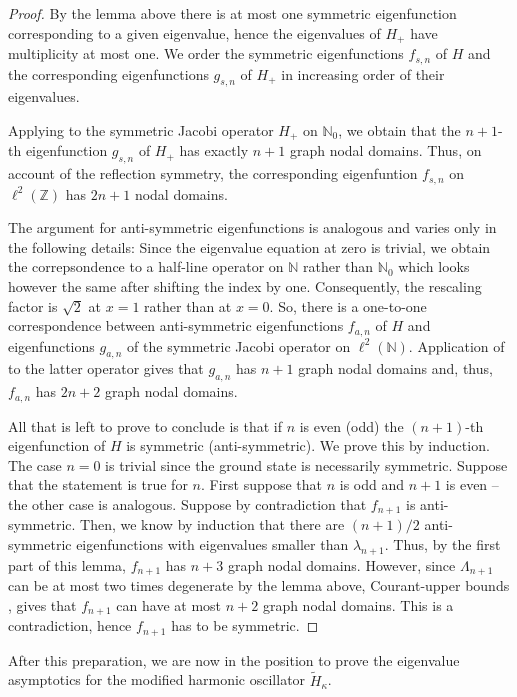 \documentclass[12pt, reqno]{amsart}
\theoremstyle{definition}
\numberwithin{equation}{section}
\newcommand{\Z}{{\mathbb Z}}
\newcommand{\N}{{\mathbb N}}
\begin{document}
\begin{proof}
    By the lemma above there is at most one symmetric eigenfunction corresponding to a given eigenvalue, hence the eigenvalues of $H_+$ have multiplicity at most one. We order the symmetric eigenfunctions $f_{s,n}$ of $H$ and the corresponding eigenfunctions $g_{s,n}$ of $H_+$ in increasing order of their eigenvalues.

Applying  \cite[Corollary 4.9]{Teschl2000} to the symmetric Jacobi operator $H_+$ on $\mathbb{N}_0$, we obtain that the $n+1$-th eigenfunction $g_{s,n}$ of $H_+$ has exactly $n+1$ graph nodal domains.
 Thus, on account of the reflection symmetry, the corresponding  eigenfuntion $f_{s,n}$ on $\ell^2(\Z)$ has $2n+1$ nodal domains.

The argument for anti-symmetric eigenfunctions is analogous and varies only in the following details: Since the eigenvalue equation at zero is trivial, we obtain the correpsondence to a half-line operator on $ \N $ rather than $ \N_0 $ which looks however the same after shifting the index by one. Consequently, the rescaling factor is $\sqrt{2}$ at $x=1$ rather than at $x=0$. So, there is a one-to-one correspondence between anti-symmetric eigenfunctions $f_{a,n}$ of $H$ and eigenfunctions $g_{a,n}$ of the symmetric Jacobi operator on $\ell^2(\mathbb{N})$. Application of \cite[Corollary 4.9]{Teschl2000} to the latter operator gives that $g_{a,n}$ has $n+1$ graph nodal domains and, thus, $f_{a,n}$ has $2n+2$ graph nodal domains.


All that is left to prove to conclude is that if $n$ is even (odd) the $(n+1)$-th eigenfunction of $H$ is symmetric (anti-symmetric). We prove this by induction. The case $n=0$ is trivial since the ground state is necessarily symmetric. Suppose that the statement is true for $n$. First suppose that $n$ is odd and $n+1$ is even -- the other case is analogous. Suppose by contradiction that $f_{n+1}$ is anti-symmetric. Then, we know by induction that there are $(n+1)/2$ anti-symmetric eigenfunctions with eigenvalues smaller than $\lambda_{n+1}$. Thus, by the first part of this lemma, $f_{n+1}$ has $n+3$ graph nodal domains. However, since $\Lambda_{n+1}$ can be at most two times degenerate by the lemma above,  Courant-upper bounds \cite{KellerSchwarz2020,Davies}, gives that $f_{n+1}$ can have at most $n+2$ graph nodal domains. This is a contradiction, hence $f_{n+1}$ has to be symmetric.
\end{proof}


After this preparation, we are now in the position to prove the eigenvalue asymptotics for the modified harmonic oscillator $\tilde H_\kappa$.
\end{document}
